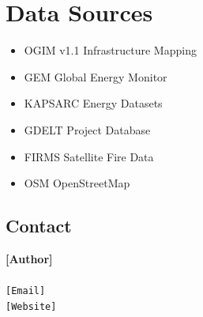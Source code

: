 \documentclass[11pt]{article}
\begin{document}
\hfill%
\begin{minipage}[t]{0.22\textwidth}

\section{Data Sources}
\vspace{0.15cm}

\begin{itemize}[leftmargin=0.2cm,itemsep=0.15cm]
\item OGIM v1.1 Infrastructure Mapping
\item GEM Global Energy Monitor  
\item KAPSARC Energy Datasets
\item GDELT Project Database
\item FIRMS Satellite Fire Data
\item OSM OpenStreetMap
\end{itemize}

\vspace{0.5cm}

\subsection{Contact}
\vspace{0.15cm}

{\normalsize
\textbf{[Author]}\\
[Institution]\\
\texttt{[Email]}\\
\texttt{[Website]}
}

\end{minipage}

\vfill
\end{document}
